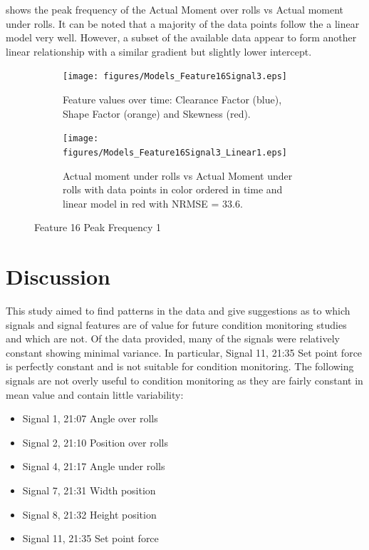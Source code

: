 \documentclass[]{article}
\begin{document}
 shows the peak frequency of the Actual Moment over rolls vs Actual moment under rolls. It can be noted that a majority of the data points follow the a linear model very well. However, a subset of the available data appear to form another linear relationship with a similar gradient but slightly lower intercept.
\begin{figure}[H]
	\centering
	\begin{subfigure}[t]{.45\textwidth}
		\centering
    		\texttt{[image: figures/Models\_Feature16Signal3.eps]}
	 	\caption{Feature values over time: Clearance Factor (blue), Shape Factor (orange) and Skewness (red).}
	  	\label{fig:Models_Feature16Signal3}
	\end{subfigure}
	\hspace*{\fill}%
	\begin{subfigure}[t]{.45\textwidth}
	  \centering
 	   	\texttt{[image: figures/Models\_Feature16Signal3\_Linear1.eps]}
	  	\caption{Actual moment under rolls vs Actual Moment under rolls with data points in color ordered in time and linear model in red with \gls{NRMSE} = 33.6.}
	  	\label{fig:Models_Feature16Signal3_Linear1}
	\end{subfigure}
   	\caption{Feature 16 Peak Frequency 1}
    \label{fig:Models_Feature16Signal3_Caption}
\end{figure}

\clearpage 

\section{Discussion}
This study aimed to find patterns in the data and  give suggestions as to which signals and signal features are of value for future condition monitoring studies and which are not. Of the data provided, many of the signals were relatively constant showing minimal variance. In particular, Signal 11, 21:35 Set point force is perfectly constant and is not suitable for condition monitoring. The following signals are not overly useful to condition monitoring as they are fairly constant in mean value and contain little variability: 
\begin{itemize}
\item Signal 1, 21:07 Angle over rolls
\item Signal 2, 21:10 Position over rolls
\item Signal 4, 21:17 Angle under rolls
\item Signal 7, 21:31 Width position
\item Signal 8, 21:32 Height position
\item Signal 11, 21:35 Set point force
\end{itemize}
\end{document}
